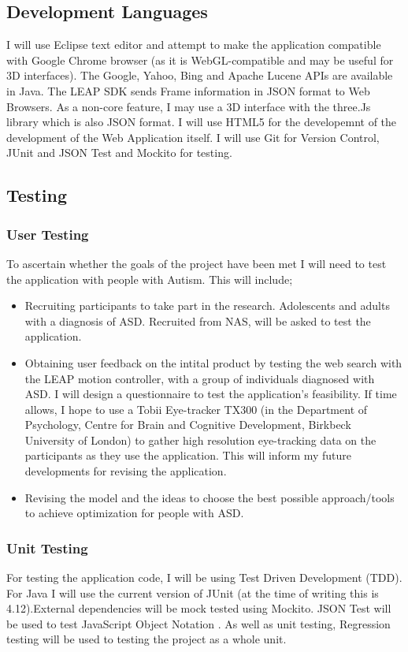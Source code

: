 \documentclass[10pt]{article}
\begin{document}
\subsection{Development Languages}
I will use Eclipse text editor and attempt to make the application compatible with Google Chrome browser (as it is WebGL-compatible and may be useful for 3D interfaces). The Google, Yahoo, Bing and Apache Lucene APIs are available in Java. The LEAP SDK sends Frame information in JSON format to Web Browsers. As a non-core feature, I may use a 3D interface with the three.Js library which is also JSON format. I will use HTML5 for the developemnt of the development of the Web Application itself. I will use Git for Version Control, JUnit and JSON Test and Mockito for testing.

\subsection{Testing}
\subsubsection{User Testing}
To ascertain whether the goals of the project have been met I will need to test the application with people with Autism. This will include;
\begin{itemize}
\item Recruiting participants to take part in the research. Adolescents and adults with a diagnosis of ASD. Recruited from NAS, will be asked to test the application.
\item Obtaining user feedback on the intital product by testing the web search with the LEAP motion controller, with a group of individuals diagnosed with ASD. I will design a questionnaire to test the application's feasibility. If time allows, I hope to use a Tobii Eye-tracker TX300 (in the Department of Psychology, Centre for Brain and Cognitive Development, Birkbeck University of London) to gather high resolution eye-tracking data on the participants as they use the application. This will inform my future developments for revising the application.
\item Revising the model and the ideas to choose the best possible approach/tools to achieve optimization for people with ASD.
\end{itemize}

\subsubsection{Unit Testing}
For testing the application code, I will be using Test Driven Development (TDD). For Java I will use the current version of JUnit (at the time of writing this is 4.12).External dependencies will be mock tested using Mockito. JSON Test will be used to test JavaScript Object Notation \cite{jsontest}. As well as unit testing, Regression testing will be used to testing the project as a whole unit.
\end{document}
